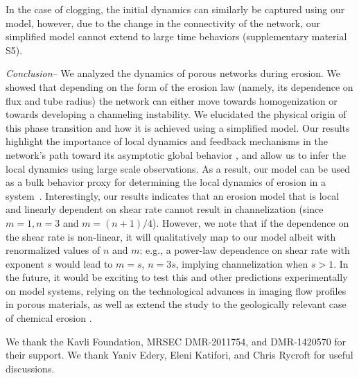 \documentclass[%
reprint,
 amsmath,amssymb,
 aps,
prl,
]{revtex4-1}
\begin{document}
In the case of clogging, the initial dynamics can similarly be captured using our model, however, due to the change in the connectivity of the network, our simplified model cannot extend to large time behaviors (supplementary material S5).
 

%
\textit{Conclusion}-- {We analyzed the dynamics of porous networks during erosion.  We showed that depending on the form of the erosion law (namely, its dependence on flux and tube radius) the network can either move towards homogenization or towards developing a channeling instability.  We elucidated the physical origin of this phase transition and how it is achieved using a simplified model. Our results highlight the importance of local dynamics and feedback mechanisms in the network's path toward its asymptotic global behavior \cite{ronellenfitsch2016global,corson2010fluctuations,katifori2010damage,hu2013adaptation,ocko2015feedback},  and allow us to infer the local dynamics using large scale observations. As a result, our model can be used as a bulk behavior proxy for determining the local dynamics of erosion in a system~\cite{mahadevan2012flow}. Interestingly, our results indicates that an erosion model that is local and linearly dependent on shear rate cannot result in channelization (since $m=1,n=3$ and $m=(n+1)/4$). However, we note that if the dependence on the shear rate is non-linear, it will qualitatively map to our model albeit with renormalized values of $n$ and $m$: e.g., a power-law dependence on shear rate with exponent $s$ would lead to $m =s$, $n = 3 s$, implying channelization when $s>1$. In the future, it would be exciting to test this and other predictions experimentally on model systems, relying on the technological advances in imaging flow profiles in porous materials, as well as extend the study to the geologically relevant case of chemical erosion \cite{edery2014origins,edery2016characterization}. 
}



\begin{acknowledgments}
We thank the Kavli Foundation, MRSEC  DMR-2011754, and DMR-1420570 for their support. We thank Yaniv Edery,  Eleni Katifori, and Chris Rycroft
for useful discussions.
\end{acknowledgments}




\appendix
\end{document}
